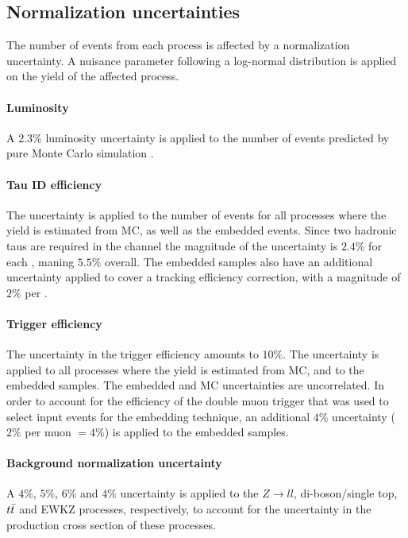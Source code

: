 \subsection{Normalization uncertainties}

The number of events from each process is affected by a normalization uncertainty. A nuisance parameter following a log-normal distribution is applied on the yield of the affected process.

\paragraph{Luminosity} A $2.3 \%$ luminosity uncertainty is applied to the number of events predicted by pure Monte Carlo simulation \cite{CMS:2018elu}.

\paragraph{Tau ID efficiency} The uncertainty is applied to the number of events for all processes where the yield is estimated from MC, as well as the embedded events. Since two hadronic taus are required in the \tauh\tauh channel the magnitude of the uncertainty is $2.4\%$ for each \tauh, maning $5.5\%$ overall. The embedded samples also have an additional uncertainty applied to cover a tracking efficiency correction, with a magnitude of $2\%$ per \tauh.

\paragraph{Trigger efficiency} The uncertainty in the trigger efficiency amounts to $10\%$. The uncertainty is applied to all processes where the yield is estimated from MC, and to the embedded samples. The embedded and MC uncertainties are uncorrelated. In order to account for the efficiency of the double muon trigger that was used to select input events for the embedding technique, an additional $4\%$ uncertainty ($2\%$ per muon $= 4\%$) is applied to the embedded samples.

\paragraph{Background normalization uncertainty} A $4\%$, $5\%$, $6\%$ and $4\%$ uncertainty is applied to the $Z\rightarrow ll$, di-boson/single top, $t\Bar{t}$ and EWKZ processes, respectively, to account for the uncertainty in the production cross section of these processes. 

